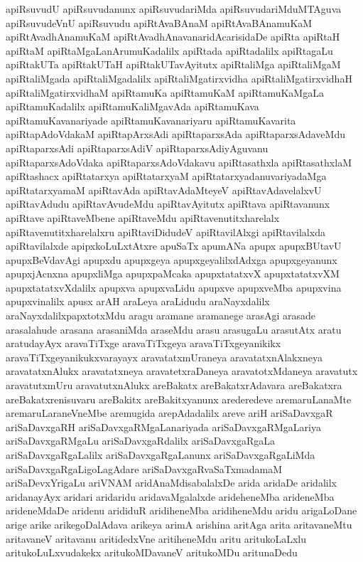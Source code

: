 {apiRsuvudU
apiRsuvudanunx
apiRsuvudariMda
apiRsuvudariMduMTAguva
apiRsuvudeVnU
apiRsuvudu
apiRtAvaBAnaM
apiRtAvaBAnamuKaM
apiRtAvadhAnamuKaM
apiRtAvadhAnavanaridAcarisidaDe
apiRta
apiRtaH
apiRtaM
apiRtaMgaLanArumuKadalilx
apiRtada
apiRtadalilx
apiRtagaLu
apiRtakUTa
apiRtakUTaH
apiRtakUTavAyitutx
apiRtaliMga
apiRtaliMgaM
apiRtaliMgada
apiRtaliMgadalilx
apiRtaliMgatirxvidha
apiRtaliMgatirxvidhaH
apiRtaliMgatirxvidhaM
apiRtamuKa
apiRtamuKaM
apiRtamuKaMgaLa
apiRtamuKadalilx
apiRtamuKaliMgavAda
apiRtamuKava
apiRtamuKavanariyade
apiRtamuKavanariyaru
apiRtamuKavarita
apiRtapAdoVdakaM
apiRtapArxsAdi
apiRtaparxsAda
apiRtaparxsAdaveMdu
apiRtaparxsAdi
apiRtaparxsAdiV
apiRtaparxsAdiyAguvanu
apiRtaparxsAdoVdaka
apiRtaparxsAdoVdakavu
apiRtasathxla
apiRtasathxlaM
apiRtashacx
apiRtatarxya
apiRtatarxyaM
apiRtatarxyadanuvariyadaMga
apiRtatarxyamaM
apiRtavAda
apiRtavAdaMteyeV
apiRtavAdavelalxvU
apiRtavAdudu
apiRtavAvudeMdu
apiRtavAyitutx
apiRtava
apiRtavanunx
apiRtave
apiRtaveMbene
apiRtaveMdu
apiRtavenutitxharelalx
apiRtavenutitxharelalxru
apiRtaviDidudeV
apiRtavilAlxgi
apiRtavilalxda
apiRtavilalxde
apipxkoLuLxtAtxre
apuSaTx
apumANa
apupx
apupxBUtavU
apupxBeVdavAgi
apupxdu
apupxgeya
apupxgeyalilxdAdxga
apupxgeyanunx
apupxjAcnxna
apupxliMga
apupxpaMcaka
apupxtatatxvX
apupxtatatxvXM
apupxtatatxvXdalilx
apupxva
apupxvaLidu
apupxve
apupxveMba
apupxvina
apupxvinalilx
apusx
arAH
araLeya
araLidudu
araNayxdalilx
araNayxdalilxpapxtotxMdu
aragu
aramane
aramanege
arasAgi
arasade
arasalahude
arasana
arasaniMda
araseMdu
arasu
arasugaLu
arasutAtx
aratu
aratudayAyx
aravaTiTxge
aravaTiTxgeya
aravaTiTxgeyanikikx
aravaTiTxgeyanikukxvarayayx
aravatatxmUraneya
aravatatxnAlakxneya
aravatatxnAlukx
aravatatxneya
aravatetxraDaneya
aravatotxMdaneya
aravatutx
aravatutxmUru
aravatutxnAlukx
areBakatx
areBakatxrAdavara
areBakatxra
areBakatxrenisuvaru
areBakitx
areBakitxyanunx
arederedeve
aremaruLanaMte
aremaruLaraneVneMbe
aremugida
arepAdadalilx
areve
ariH
ariSaDavxgaR
ariSaDavxgaRH
ariSaDavxgaRMgaLanariyada
ariSaDavxgaRMgaLariya
ariSaDavxgaRMgaLu
ariSaDavxgaRdalilx
ariSaDavxgaRgaLa
ariSaDavxgaRgaLalilx
ariSaDavxgaRgaLanunx
ariSaDavxgaRgaLiMda
ariSaDavxgaRgaLigoLagAdare
ariSaDavxgaRvaSaTxmadamaM
ariSaDevxYrigaLu
ariVNAM
aridAnaMdisabalalxDe
arida
aridaDe
aridalilx
aridanayAyx
aridari
aridaridu
aridavaMgalalxde
arideheneMba
arideneMba
arideneMdaDe
aridenu
arididuR
aridiheneMba
aridiheneMdu
aridu
arigaLoDane
arige
arike
arikegoDalAdava
arikeya
arimA
arishina
aritAga
arita
aritavaneMtu
aritavaneV
aritavanu
aritidedxVne
aritiheneMdu
aritu
aritukoLaLxlu
aritukoLuLxvudakekx
aritukoMDavaneV
aritukoMDu
aritunaDedu
}
